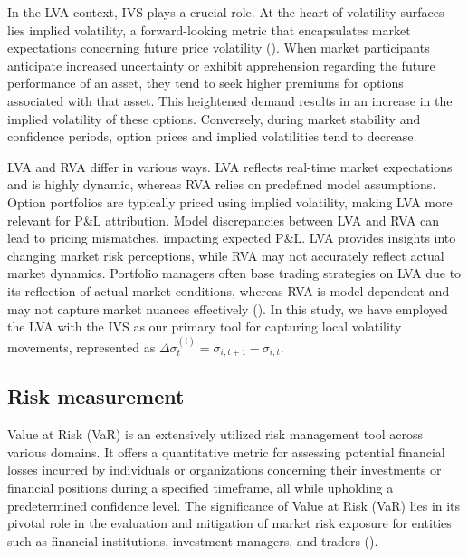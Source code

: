 In the LVA context, IVS plays a crucial role. At the heart of volatility surfaces lies implied volatility, a forward-looking metric that encapsulates market expectations concerning future price volatility (\cite{chan2017machine}). When market participants anticipate increased uncertainty or exhibit apprehension regarding the future performance of an asset, they tend to seek higher premiums for options associated with that asset. This heightened demand results in an increase in the implied volatility of these options. Conversely, during market stability and confidence periods, option prices and implied volatilities tend to decrease.

LVA and RVA differ in various ways. LVA reflects real-time market expectations and is highly dynamic, whereas RVA relies on predefined model assumptions. Option portfolios are typically priced using implied volatility, making LVA more relevant for P\&L attribution. Model discrepancies between LVA and RVA can lead to pricing mismatches, impacting expected P\&L. LVA provides insights into changing market risk perceptions, while RVA may not accurately reflect actual market dynamics. Portfolio managers often base trading strategies on LVA due to its reflection of actual market conditions, whereas RVA is model-dependent and may not capture market nuances effectively (\cite{daglish2007volatility}). In this study, we have employed the LVA with the IVS as our primary tool for capturing local volatility movements, represented as $\Delta\sigma_t^{(i)}=\sigma_{i,t+1}-\sigma_{i,t}$.

\subsection{Risk measurement}\label{sec:VaR}

Value at Risk (VaR) is an extensively utilized risk management tool across various domains. It offers a quantitative metric for assessing potential financial losses incurred by individuals or organizations concerning their investments or financial positions during a specified timeframe, all while upholding a predetermined confidence level. The significance of Value at Risk (VaR) lies in its pivotal role in the evaluation and mitigation of market risk exposure for entities such as financial institutions, investment managers, and traders (\cite{hull2012risk}).

